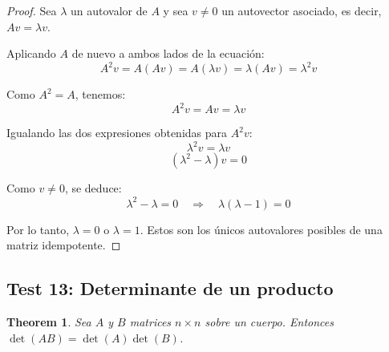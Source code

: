 \documentclass[11pt,a4paper]{article}
\theoremstyle{plain}
\newtheorem{theorem}{Theorem}[section]
\theoremstyle{definition}
\begin{document}
\begin{proof}
Sea $\lambda$ un autovalor de $A$ y sea $v \neq 0$ un autovector asociado, es decir, $Av = \lambda v$.

Aplicando $A$ de nuevo a ambos lados de la ecuación:
\[
A^2 v = A(Av) = A(\lambda v) = \lambda (Av) = \lambda^2 v
\]

Como $A^2 = A$, tenemos:
\[
A^2 v = Av = \lambda v
\]

Igualando las dos expresiones obtenidas para $A^2 v$:
\[
\lambda^2 v = \lambda v
\]
\[
(\lambda^2 - \lambda) v = 0
\]

Como $v \neq 0$, se deduce:
\[
\lambda^2 - \lambda = 0 \quad \Longrightarrow \quad \lambda(\lambda - 1) = 0
\]

Por lo tanto, $\lambda = 0$ o $\lambda = 1$. Estos son los únicos autovalores posibles de una matriz idempotente.
\end{proof}

\subsection{Test 13: Determinante de un producto}

\begin{theorem}
Sea $A$ y $B$ matrices $n \times n$ sobre un cuerpo. Entonces $\det(AB) = \det(A)\det(B)$.
\end{theorem}
\end{document}

